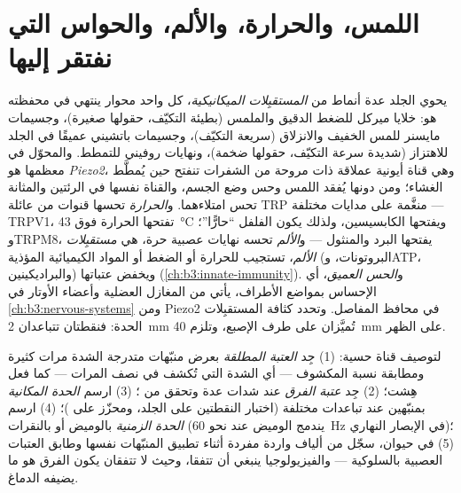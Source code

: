 \section{اللمس، والحرارة، والألم، والحواس التي نفتقر إليها}

\begin{definition}\label{def:b3:sensory-systems:somato}
يحوي الجلد عدة أنماط من \emph{المستقبِلات الميكانيكية}، كل
واحد محوار ينتهي في محفظته هو: خلايا ميركل للضغط الدقيق
والملمس (بطيئة التكيّف، حقولها صغيرة)، وجسيمات مايسنر للمس
الخفيف والانزلاق (سريعة التكيّف)، وجسيمات باتشيني عميقًا في
الجلد للاهتزاز (شديدة سرعة التكيّف، حقولها ضخمة)، ونهايات
روفيني للتمطط. والمحوّل في معظمها هو \emph{Piezo2}، وهي
قناة أيونية عملاقة ذات مروحة من الشفرات تنفتح حين يُمطَّط
الغشاء؛ ومن دونها يُفقد اللمس وحس وضع الجسم، والقناة نفسها
في الرئتين والمثانة تحس امتلاءهما. و\emph{الحرارة} تحسها
قنوات من عائلة TRP منغَّمة على مدايات مختلفة --- TRPV1،
تفتحها الحرارة فوق \qty{43}{\celsius} ويفتحها الكابسيسين،
ولذلك يكون الفلفل ``حارًّا''؛ وTRPM8، يفتحها البرد
والمنثول --- و\emph{الألم} تحسه نهايات عصبية حرة، هي
\emph{مستقبِلات الألم}، تستجيب للحرارة أو الضغط أو المواد
الكيميائية المؤذية (البروتونات، وATP، والبراديكينين)
ويخفض  عتباتها (\cref{ch:b3:innate-immunity}).
و\emph{الحس العميق}، أي الإحساس بمواضع الأطراف، يأتي من
المغازل العضلية وأعضاء الأوتار في \cref{ch:b3:nervous-systems}
ومن Piezo2 في محافظ المفاصل. وتحدد كثافة المستقبِلات الحدة:
فنقطتان تتباعدان \qty{2}{mm} تُميَّزان على طرف الإصبع،
وتلزم \qty{40}{mm} على الظهر.
\end{definition}

\begin{method}\label{met:b3:sensory-systems:psychophysics}
لتوصيف قناة حسية: (1) جِد \emph{العتبة المطلقة} بعرض منبّهات
متدرجة الشدة مرات كثيرة ومطابقة نسبة المكشوف --- أي الشدة
التي تُكشف في نصف المرات --- كما فعل هِشت؛ (2) جِد
\emph{عتبة الفرق} عند شدات عدة وتحقق من ؛ (3)
ارسم \emph{الحدة المكانية} بمنبّهين عند تباعدات مختلفة
(اختبار النقطتين على الجلد، ومحزّز على )؛ (4) ارسم
\emph{الحدة الزمنية} بالوميض أو بالنقرات (يندمج الوميض عند
نحو \qty{60}{Hz} في الإبصار النهاري)؛ (5) في حيوان، سجّل من
ألياف واردة مفردة أثناء تطبيق المنبّهات نفسها وطابق العتبات
العصبية بالسلوكية ---  والفيزيولوجيا
ينبغي أن تتفقا، وحيث لا تتفقان يكون الفرق هو ما يضيفه
الدماغ.
\end{method}

